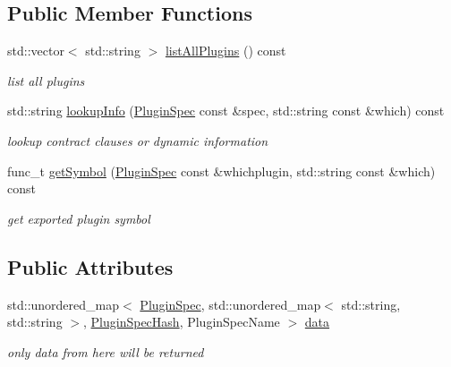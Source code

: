 \subsection*{Public Member Functions}
\begin{DoxyCompactItemize}
\item 
std\+::vector$<$ std\+::string $>$ \hyperlink{classkdb_1_1tools_1_1MockPluginDatabase_a3663848683953bfad7123c48c00ab404}{list\+All\+Plugins} () const
\begin{DoxyCompactList}\small\item\em list all plugins \end{DoxyCompactList}\item 
std\+::string \hyperlink{classkdb_1_1tools_1_1MockPluginDatabase_ae352c27aa51bc8c2ea8c708d14f6fc76}{lookup\+Info} (\hyperlink{classkdb_1_1tools_1_1PluginSpec}{Plugin\+Spec} const \&spec, std\+::string const \&which) const
\begin{DoxyCompactList}\small\item\em lookup contract clauses or dynamic information \end{DoxyCompactList}\item 
func\+\_\+t \hyperlink{classkdb_1_1tools_1_1MockPluginDatabase_a5a701fd310be0e9f7d14a865c0226517}{get\+Symbol} (\hyperlink{classkdb_1_1tools_1_1PluginSpec}{Plugin\+Spec} const \&whichplugin, std\+::string const \&which) const
\begin{DoxyCompactList}\small\item\em get exported plugin symbol \end{DoxyCompactList}\end{DoxyCompactItemize}
\subsection*{Public Attributes}
\begin{DoxyCompactItemize}
\item 
std\+::unordered\+\_\+map$<$ \hyperlink{classkdb_1_1tools_1_1PluginSpec}{Plugin\+Spec}, std\+::unordered\+\_\+map$<$ std\+::string, std\+::string $>$, \hyperlink{structkdb_1_1tools_1_1PluginSpecHash}{Plugin\+Spec\+Hash}, Plugin\+Spec\+Name $>$ \hyperlink{classkdb_1_1tools_1_1MockPluginDatabase_a5de7756d9e7fb78d53903c92208d7fbe}{data}
\begin{DoxyCompactList}\small\item\em only data from here will be returned \end{DoxyCompactList}\end{DoxyCompactItemize}
